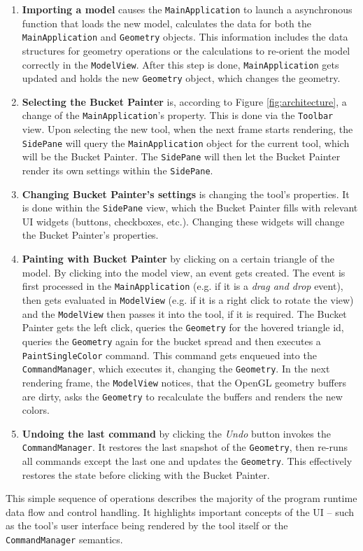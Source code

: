 \begin{enumerate}
\item \textbf{Importing a model} causes the \texttt{MainApplication} to launch a asynchronous function that loads the new model, calculates the data for both the \texttt{MainApplication} and \texttt{Geometry} objects. This information includes the data structures for geometry operations or the calculations to re-orient the model correctly in the \texttt{ModelView}. After this step is done, \texttt{MainApplication} gets updated and holds the new \texttt{Geometry} object, which changes the geometry.

\item \textbf{Selecting the Bucket Painter} is, according to Figure \ref{fig:architecture}, a change of the \texttt{MainApplication}'s property. This is done via the \texttt{Toolbar} view. Upon selecting the new tool, when the next frame starts rendering, the \texttt{SidePane} will query the \texttt{MainApplication} object for the current tool, which will be the Bucket Painter. The \texttt{SidePane} will then let the Bucket Painter render its own settings within the \texttt{SidePane}.

\item \textbf{Changing Bucket Painter's settings} is changing the tool's properties. It is done within the \texttt{SidePane} view, which the Bucket Painter fills with relevant UI widgets (buttons, checkboxes, etc.). Changing these widgets will change the Bucket Painter's properties.

\item \textbf{Painting with Bucket Painter} by clicking on a certain triangle of the model. By clicking into the model view, an event gets created. The event is first processed in the \texttt{MainApplication} (e.g. if it is a \textit{drag and drop} event), then gets evaluated in \texttt{ModelView} (e.g. if it is a right click to rotate the view) and the \texttt{ModelView} then passes it into the tool, if it is required. The Bucket Painter gets the left click, queries the \texttt{Geometry} for the hovered triangle id, queries the \texttt{Geometry} again for the bucket spread and then executes a \texttt{PaintSingleColor} command. This command gets enqueued into the \texttt{CommandManager}, which executes it, changing the \texttt{Geometry}. In the next rendering frame, the \texttt{ModelView} notices, that the OpenGL geometry buffers are dirty, asks the \texttt{Geometry} to recalculate the buffers and renders the new colors.

\item \textbf{Undoing the last command} by clicking the \textit{Undo} button invokes the \texttt{CommandManager}. It restores the last snapshot of the \texttt{Geometry}, then re-runs all commands except the last one and updates the \texttt{Geometry}. This effectively restores the state before clicking with the Bucket Painter.
\end{enumerate}

This simple sequence of operations describes the majority of the program runtime data flow and control handling. It highlights important concepts of the UI -- such as the tool's user interface being rendered by the tool itself or the \texttt{CommandManager} semantics.